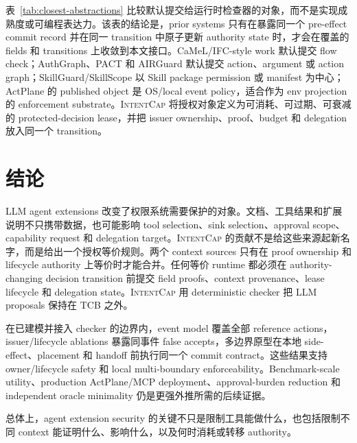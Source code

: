 \documentclass[UTF8,a4paper,11pt]{ctexart}
\newcommand{\sys}{\textsc{IntentCap}\xspace}
\begin{document}
表~\ref{tab:closest-abstractions} 比较默认提交给运行时检查器的对象，而不是实现成熟度或可编程表达力。该表的结论是，prior systems 只有在暴露同一个 pre-effect commit record 并在同一 transition 中原子更新 authority state 时，才会在覆盖的 fields 和 transitions 上收敛到本文接口。CaMeL/IFC-style work 默认提交 flow check；AuthGraph、PACT 和 AIRGuard 默认提交 action、argument 或 action graph；SkillGuard/SkillScope 以 Skill package permission 或 manifest 为中心；ActPlane 的 published object 是 OS/local event policy，适合作为 env projection 的 enforcement substrate。\sys 将授权对象定义为可消耗、可过期、可衰减的 protected-decision lease，并把 issuer ownership、proof、budget 和 delegation 放入同一个 transition。

\section{结论}

LLM agent extensions 改变了权限系统需要保护的对象。文档、工具结果和扩展说明不只携带数据，也可能影响 tool selection、sink selection、approval scope、capability request 和 delegation target。\sys 的贡献不是给这些来源起新名字，而是给出一个授权等价规则。两个 context sources 只有在 proof ownership 和 lifecycle authority 上等价时才能合并。任何等价 runtime 都必须在 authority-changing decision transition 前提交 field proofs、context provenance、lease lifecycle 和 delegation state。\sys 用 deterministic checker 把 LLM proposals 保持在 TCB 之外。

在已建模并接入 checker 的边界内，event model 覆盖全部 reference actions，issuer/lifecycle ablations 暴露同事件 false accepts，多边界原型在本地 side-effect、placement 和 handoff 前执行同一个 commit contract。这些结果支持 owner/lifecycle safety 和 local multi-boundary enforceability。Benchmark-scale utility、production ActPlane/MCP deployment、approval-burden reduction 和 independent oracle minimality 仍是更强外推所需的后续证据。

总体上，agent extension security 的关键不只是限制工具能做什么，也包括限制不同 context 能证明什么、影响什么，以及何时消耗或转移 authority。



\end{document}
